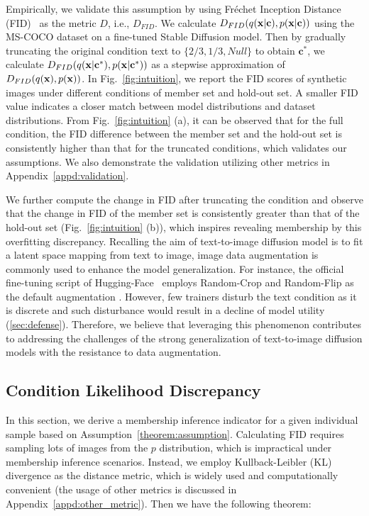 Empirically, we validate this assumption by using Fréchet Inception Distance (FID)~\cite{heusel2017gans} as the metric $D$, i.e., \(D_{FID}\). 
We calculate $D_{FID}(q(\mathbf{x}|\mathbf{c}), p(\mathbf{x}|\mathbf{c}))$ using the  MS-COCO \cite{lin2014microsoft} dataset on a fine-tuned Stable Diffusion \cite{rombach2022high} model. Then by gradually truncating the original condition text to $\{2\big/3, 1\big/3, Null\}$ to obtain $\mathbf{c}^*$, we calculate $D_{FID}(q(\mathbf{x}|\mathbf{c}^*), p(\mathbf{x}|\mathbf{c}^*))$ as a stepwise approximation of  \(D_{FID}(q(\mathbf{x}), p(\mathbf{x}))\).
In Fig.~\ref{fig:intuition}, we report the FID scores of synthetic images under different conditions of member set and hold-out set. A smaller FID value indicates a closer match between model distributions and dataset distributions. 
From Fig.~\ref{fig:intuition} (a), it can be observed that for the full condition, the FID difference between the member set and the hold-out set is consistently higher than that for the truncated conditions, which validates our assumptions.  
We also demonstrate the validation utilizing other metrics in Appendix~\ref{appd:validation}.



We further compute the change in FID after truncating the condition and observe that the change in FID of the member set is consistently greater than that of the hold-out set (Fig.~\ref{fig:intuition} (b)), which inspires revealing membership 
by this overfitting discrepancy.
Recalling the aim of text-to-image diffusion model is to fit a latent space mapping from text to image, 
image data augmentation is commonly used to enhance the model generalization.
For instance, the official fine-tuning script of Hugging-Face~\cite{text-to-image-ft} employs Random-Crop and Random-Flip as the default augmentation \cite{text-to-image-ft-python}.
However, few trainers disturb the text condition as it is discrete and such disturbance would result in a decline of model utility (\cref{sec:defense}). 
Therefore, we believe that leveraging this phenomenon contributes to addressing the challenges of the strong generalization of text-to-image diffusion models with the resistance to data augmentation. 


\subsection{Condition Likelihood Discrepancy}\label{sec:clid}
In this section, we derive a membership inference indicator for a given individual sample based on Assumption~\ref{theorem:assumption}.
Calculating FID requires sampling lots of images from the $p$ distribution, 
which is impractical under membership inference scenarios.
Instead, we employ Kullback-Leibler (KL) divergence as the distance metric, which is widely used and computationally convenient 
(the usage of other metrics is discussed in Appendix~\ref{appd:other_metric}). Then we have the following theorem:

